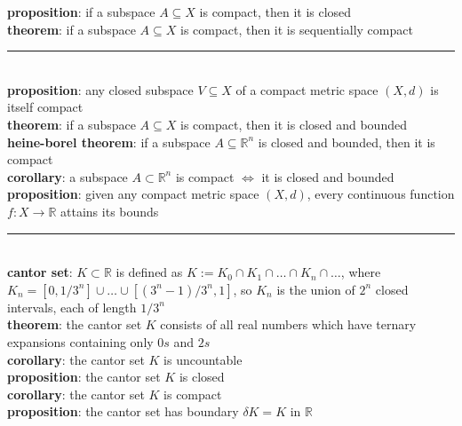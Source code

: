\documentclass[a4paper]{article}
\newcommand*\linesep[0]{\noindent\rule{\textwidth}{0.5pt}\\}
\begin{document}
\begin{framed}
	\noindent
	\textbf{proposition}: if a subspace $A \subseteq X$ is compact, then it is closed\\
	
	\noindent
	\textbf{theorem}: if a subspace $A \subseteq X$ is compact, then it is sequentially compact
	
	\linesep
	\textbf{proposition}: any closed subspace $V \subseteq X$ of a compact metric space $(X,d)$ is itself compact\\
	
	\noindent
	\textbf{theorem}: if a subspace $A \subseteq X$ is compact, then it is closed and bounded\\
	
	\noindent
	\textbf{heine-borel theorem}: if a subspace $A \subseteq \mathbb{R}^n$ is closed and bounded, then it is compact\\
	
	\noindent
	\textbf{corollary}: a subspace $A \subset \mathbb{R}^n$ is compact $\iff$ it is closed and bounded\\
	
	\noindent
	\textbf{proposition}: given any compact metric space $(X,d)$, every continuous function $f: X \rightarrow \mathbb{R}$ attains its bounds
	
	\linesep
	\textbf{cantor set}: $K \subset \mathbb{R}$ is defined as $K := K_0 \cap K_1 \cap \dots \cap K_n \cap \dots$, where $K_n = [0, 1/3^n] \cup \dots \cup [(3^n - 1) / 3^n, 1]$, so $K_n$ is the union of $2^n$ closed intervals, each of length $1/3^n$\\
	
	\noindent
	\textbf{theorem}: the cantor set $K$ consists of all real numbers which have ternary expansions containing only $0s$ and $2s$\\
	
	\noindent
	\textbf{corollary}: the cantor set $K$ is uncountable\\
	
	\noindent
	\textbf{proposition}: the cantor set $K$ is closed\\
	
	\noindent
	\textbf{corollary}: the cantor set $K$ is compact\\
	
	\noindent
	\textbf{proposition}: the cantor set has boundary $\delta K = K$ in $\mathbb{R}$
\end{framed}
\end{document}
